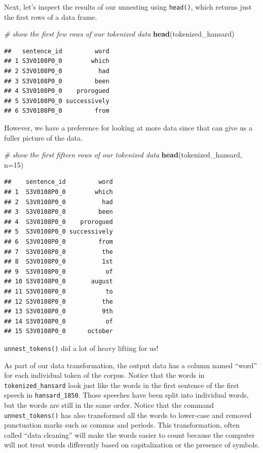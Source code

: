 \documentclass[
]{article}
\newenvironment{Shaded}{\begin{snugshade}}{\end{snugshade}}
\newcommand{\AttributeTok}[1]{\textcolor[rgb]{0.13,0.29,0.53}{#1}}
\newcommand{\CommentTok}[1]{\textcolor[rgb]{0.56,0.35,0.01}{\textit{#1}}}
\newcommand{\DecValTok}[1]{\textcolor[rgb]{0.00,0.00,0.81}{#1}}
\newcommand{\FunctionTok}[1]{\textcolor[rgb]{0.13,0.29,0.53}{\textbf{#1}}}
\newcommand{\NormalTok}[1]{#1}
\begin{document}
Next, let's inspect the results of our unnesting using \texttt{head()},
which returns just the first rows of a data frame.

\begin{Shaded}
\begin{Highlighting}[]
\CommentTok{\# show the first few rows of our tokenized data}
\FunctionTok{head}\NormalTok{(tokenized\_hansard)}
\end{Highlighting}
\end{Shaded}

\begin{verbatim}
##   sentence_id         word
## 1 S3V0108P0_0        which
## 2 S3V0108P0_0          had
## 3 S3V0108P0_0         been
## 4 S3V0108P0_0    prorogued
## 5 S3V0108P0_0 successively
## 6 S3V0108P0_0         from
\end{verbatim}

However, we have a preference for looking at more data since that can
give us a fuller picture of the data.

\begin{Shaded}
\begin{Highlighting}[]
\CommentTok{\# show the first fifteen rows of our tokenized data}
\FunctionTok{head}\NormalTok{(tokenized\_hansard, }\AttributeTok{n=}\DecValTok{15}\NormalTok{)}
\end{Highlighting}
\end{Shaded}

\begin{verbatim}
##    sentence_id         word
## 1  S3V0108P0_0        which
## 2  S3V0108P0_0          had
## 3  S3V0108P0_0         been
## 4  S3V0108P0_0    prorogued
## 5  S3V0108P0_0 successively
## 6  S3V0108P0_0         from
## 7  S3V0108P0_0          the
## 8  S3V0108P0_0          1st
## 9  S3V0108P0_0           of
## 10 S3V0108P0_0       august
## 11 S3V0108P0_0           to
## 12 S3V0108P0_0          the
## 13 S3V0108P0_0          9th
## 14 S3V0108P0_0           of
## 15 S3V0108P0_0      october
\end{verbatim}

\texttt{unnest\_tokens()} did a lot of heavy lifting for us!

As part of our data transformation, the output data has a column named
``word'' for each individual token of the corpus. Notice that the words
in \texttt{tokenized\_hansard} look just like the words in the first
sentence of the first speech in \texttt{hansard\_1850}. Those speeches
have been split into individual words, but the words are still in the
same order. Notice that the command \texttt{unnest\_tokens()} has also
transformed all the words to lower-case and removed punctuation marks
such as commas and periods. This transformation, often called ``data
cleaning'' will make the words easier to count because the computer will
not treat words differently based on capitalization or the presence of
symbols.
\end{document}
